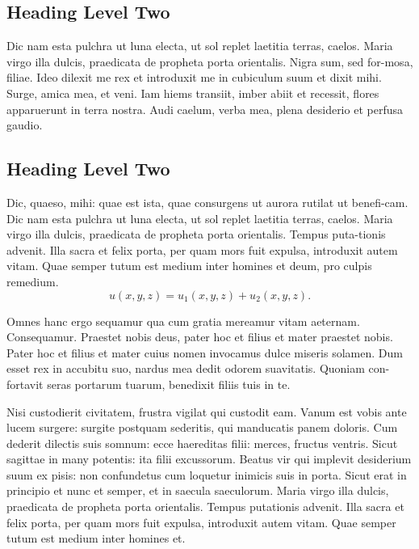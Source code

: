 \documentclass[pdftex,crc]{ios-book}
\begin{document}
\subsection{Heading Level Two}

Dic nam esta pulchra ut luna electa, ut sol replet laetitia terras,
caelos. Maria virgo illa dulcis, praedicata de propheta porta
orientalis. Nigra sum, sed for-mosa, filiae. Ideo dilexit me rex et
introduxit me in cubiculum suum et dixit mihi. Surge, amica mea, et
veni. Iam hiems transiit, imber abiit et recessit, flores apparuerunt in
terra nostra. Audi caelum, verba mea, plena desiderio et perfusa gaudio.

\subsection{Heading Level Two}

Dic, quaeso, mihi: quae est ista, quae consurgens ut aurora rutilat
ut benefi-cam.  Dic nam esta pulchra ut luna electa, ut sol replet
laetitia terras, caelos.  Maria virgo illa dulcis, praedicata de
propheta porta orientalis. Tempus puta-tionis advenit. Illa sacra et
felix porta, per quam mors fuit expulsa, introduxit autem vitam. Quae
semper tutum est medium inter homines et deum, pro culpis remedium.
\begin{equation}
u(x,y,z) = u_1(x,y,z) + u_2(x,y,z).
\end{equation}

Omnes hanc ergo sequamur qua cum gratia mereamur vitam aeternam.
Consequamur. Praestet nobis deus, pater hoc et filius et mater
praestet nobis.  Pater hoc et filius et mater cuius nomen invocamus
dulce miseris solamen. Dum esset rex in accubitu suo, nardus mea
dedit odorem suavitatis. Quoniam con-fortavit seras portarum tuarum,
benedixit filiis tuis in te.

Nisi custodierit civitatem, frustra vigilat qui custodit eam. Vanum
est vobis ante lucem surgere: surgite postquam sederitis, qui
manducatis panem doloris. Cum dederit dilectis suis somnum: ecce
haereditas filii: merces, fructus ventris. Sicut sagittae in many
potentis: ita filii excussorum. Beatus vir qui implevit desiderium
suum ex pisis: non confundetus cum loquetur inimicis suis in porta.
Sicut erat in principio et nunc et semper, et in saecula saeculorum.
Maria virgo illa dulcis, praedicata de propheta porta orientalis.
Tempus putationis advenit.  Illa sacra et felix porta, per quam mors
fuit expulsa, introduxit autem vitam.  Quae semper tutum est medium
inter homines et.
\end{document}
